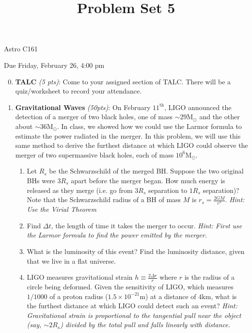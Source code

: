 \documentclass[12pt,preprint]{aastex}
\title{Problem Set 5}
\def\m{\mathrm{m}}
\def\km{\mathrm{km}}
\def\Msol{\mathrm{M_\odot}}
\newcommand\sn[2]{#1 \times 10^{#2}}
\def\rs{R_s}
\begin{document}
\maketitle
\centerline{Astro C161} 

\centerline{Due Friday, February 26, 4:00 pm}

\begin{enumerate}
\setcounter{enumi}{-1}

\item \textbf{TALC} \textit{(5 pts)}: Come to your assigned section of TALC. There will be a quiz/worksheet to record your attendance.

\item \textbf{Gravitational Waves} \textit{(50pts)}: 
	On February $11^{\mathrm{th}}$, LIGO announced the detection of a merger of two black holes, one of mass $\sim 29\Msol$ and the other about $\sim 36\Msol$. In class, we showed how we could use the Larmor formula to estimate the power radiated in the merger. In this problem, we will use this same method to derive the furthest distance at which LIGO could observe the merger of two supermassive black holes, each of mass $10^6 \Msol$. 
	\begin{enumerate}
	\item Let $\rs$ be the Schwarzschild of the merged BH. Suppose the two original BHs were $3\rs$ apart before the merger began. How much energy is released as they merge (i.e. go from $3\rs$ separation to $1\rs$ separation)? Note that the Schwarzschild radius of a BH of mass $M$ is $r_s = \frac{2GM}{c^2}$. \textit{Hint: Use the Virial Theorem}
	\item Find $\Delta t$, the length of time it takes the merger to occur. \textit{Hint: First use the Larmor formula to find the power emitted by the merger.}
	\item What is the luminosity of this event? Find the luminosity distance, given that we live in a flat universe.
	\item LIGO measures gravitational strain $h \equiv \frac{2\Delta r}{r}$ where $r$ is the radius of a circle being deformed. Given the sensitivity of LIGO, which measures $1/1000$ of a proton radius ($\sn{1.5}{-21}\m$) at a distance of $4\km$, what is the furthest distance at which LIGO could detect such an event? \textit{Hint: Gravitational strain is proportional to the tangential pull near the object (say, $\sim 2\rs$) divided by the total pull and falls linearly with distance.}
	\end{enumerate}


\end{enumerate}
\end{document}
